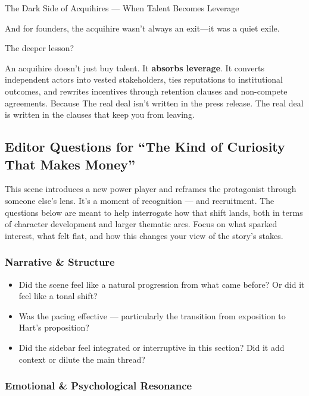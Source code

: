 \begin{HistoricalSidebar}{The Dark Side of Acquihires --- When Talent Becomes Leverage}
  \medskip
  
  And for founders, the acquihire wasn’t always an exit—it was a quiet exile.
  
  \medskip
  
  The deeper lesson?

  \medskip
  
  An acquihire doesn’t just buy talent. It \textbf{absorbs leverage}. It converts independent actors into vested stakeholders, 
  ties reputations to institutional outcomes, and rewrites incentives through retention clauses and non-compete agreements.
  Because The real deal isn’t written in the press release.  The real deal is written in the clauses that keep you from leaving.
  
\end{HistoricalSidebar}


\subsection*{Editor Questions for ``The Kind of Curiosity That Makes Money''}

This scene introduces a new power player and reframes the protagonist through someone else’s lens. It’s a moment of recognition — and recruitment. The questions below are meant to help interrogate how that shift lands, both in terms of character development and larger thematic arcs. Focus on what sparked interest, what felt flat, and how this changes your view of the story’s stakes.

\subsubsection{Narrative \& Structure}

\begin{itemize}
  \item Did the scene feel like a natural progression from what came before? Or did it feel like a tonal shift?
  \item Was the pacing effective — particularly the transition from exposition to Hart’s proposition?
  \item Did the sidebar feel integrated or interruptive in this section? Did it add context or dilute the main thread?
\end{itemize}

\subsubsection{Emotional \& Psychological Resonance}

